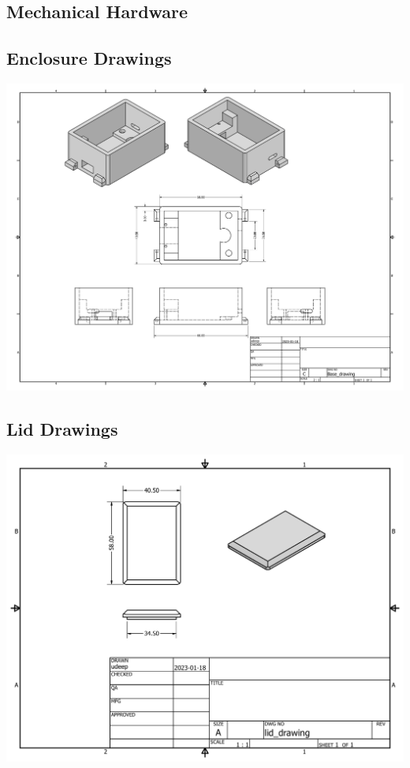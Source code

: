 \documentclass[12pt, titlepage]{article}
\begin{document}
\newpage{}

\begin{appendices}
  \section{Mechanical Hardware}
  \label{appendix:hardware}
\subsection{Enclosure Drawings}
  \begin{center}
	\label{appendix:hardware:enclosureDWG}
  \includegraphics[width=\textwidth,height=\textheight,keepaspectratio]{Base_drawing.pdf}
\end{center}
\subsection{Lid Drawings}
	\label{appendix:hardware:lidDWG}

  \includegraphics[width=\textwidth,height=\textheight,keepaspectratio]{Lid_drawing.pdf}

\end{appendices}
\end{document}
